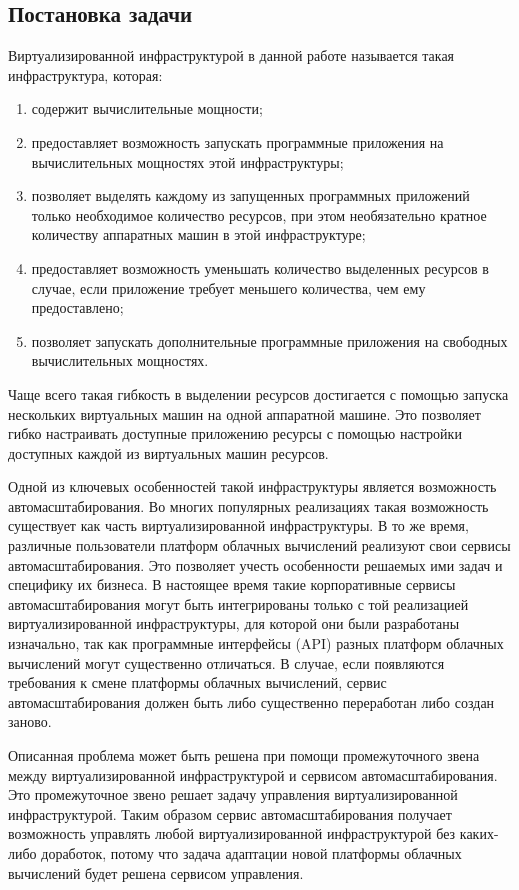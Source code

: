 \subsection{Постановка задачи}
Виртуализированной инфраструктурой в данной работе называется такая инфраструктура, которая:
\begin{enumerate}
    \item содержит вычислительные мощности;
    \item предоставляет возможность запускать программные приложения на вычислительных мощностях этой инфраструктуры;
    \item позволяет выделять каждому из запущенных программных приложений только необходимое количество ресурсов, при этом необязательно кратное количеству аппаратных машин в этой инфраструктуре;
    \item предоставляет возможность уменьшать количество выделенных ресурсов в случае, если приложение требует меньшего количества, чем ему предоставлено;
    \item позволяет запускать дополнительные программные приложения на свободных вычислительных мощностях.
\end{enumerate}

Чаще всего такая гибкость в выделении ресурсов достигается с помощью запуска нескольких виртуальных машин на одной аппаратной машине. 
Это позволяет гибко настраивать доступные приложению ресурсы с помощью настройки доступных каждой из виртуальных машин ресурсов.

Одной из ключевых особенностей такой инфраструктуры является возможность автомасштабирования\cite{portable-autoscaler-for-managing-multi-cloud-elasticity}.
Во многих популярных реализациях такая возможность существует как часть виртуализированной инфраструктуры.
В то же время, различные пользователи платформ облачных вычислений реализуют свои сервисы автомасштабирования.
Это позволяет учесть особенности решаемых ими задач и специфику их бизнеса.
В настоящее время такие корпоративные сервисы автомасштабирования могут быть интегрированы только с той реализацией виртуализированной инфраструктуры, для которой они были разработаны изначально, так как программные интерфейсы (API) разных платформ облачных вычислений могут существенно отличаться.
В случае, если появляются требования к смене платформы облачных вычислений, сервис автомасштабирования должен быть либо существенно переработан либо создан заново.

Описанная проблема может быть решена при помощи промежуточного звена между виртуализированной инфраструктурой и сервисом автомасштабирования.
Это промежуточное звено решает задачу управления виртуализированной инфраструктурой.
Таким образом сервис автомасштабирования получает возможность управлять любой виртуализированной инфраструктурой без каких-либо доработок, потому что задача адаптации новой платформы облачных вычислений будет решена сервисом управления.

